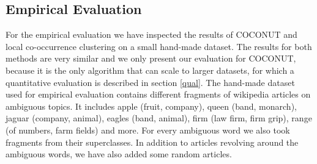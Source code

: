 \documentclass[11pt]{article}
\begin{document}
\subsection{Empirical Evaluation}
For the empirical evaluation we have inspected the results of COCONUT and local co-occurrence clustering on a small hand-made dataset. The results for both methods are very similar and we only present our evaluation for COCONUT, because it is the only algorithm that can scale to larger datasets, for which a quantitative evaluation is described in section \ref{qual}. The hand-made dataset used for empirical evaluation contains different fragments of wikipedia articles on ambiguous topics. It includes apple (fruit, company), queen (band, monarch), jaguar (company, animal), eagles (band, animal), firm (law firm, firm grip), range (of numbers, farm fields) and more. For every ambiguous word we also took fragments from their superclasses. In addition to articles revolving around the ambiguous words, we have also added some random articles.
\end{document}
